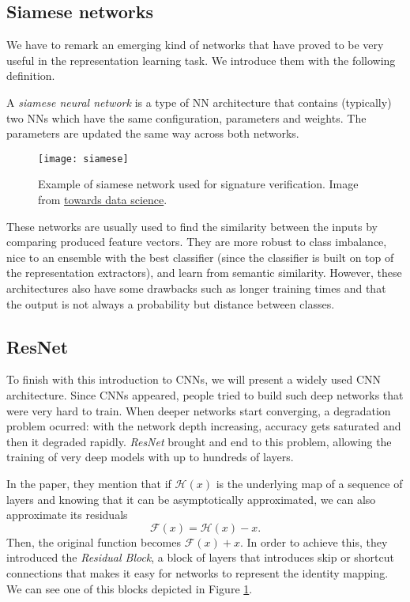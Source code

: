 \subsection{Siamese networks}


We have to remark an emerging kind of networks that have proved to be very useful in the representation learning task. We introduce them with the following definition.

\begin{ndefC}
A \emph{siamese neural network} \citep{voinov_explanation_2021} is a type of NN architecture that contains (typically) two NNs which have the same configuration, parameters and weights. The parameters are updated the same way across both networks. 
\end{ndefC}

\begin{figure}[H]
    \centering
    \texttt{[image: siamese]}
    \caption{Example of siamese network used for signature verification. Image from \href{https://towardsdatascience.com/a-friendly-introduction-to-siamese-networks-85ab17522942}{towards data science}. } \label{fig:resnet:block}
\end{figure}


These networks are usually used to find the similarity between the inputs by comparing produced feature vectors. They are more robust to class imbalance, nice to an ensemble with the best classifier (since the classifier is built on top of the representation extractors), and learn from semantic similarity. However, these architectures also have some drawbacks such as longer training times and that the output is not always a probability but distance between classes.




\subsection{ResNet}

To finish with this introduction to CNNs, we will present a widely used CNN architecture. Since CNNs appeared, people tried to build such deep networks that were very hard to train. When deeper networks start converging, a degradation problem ocurred: with the network depth increasing, accuracy gets saturated and then it degraded rapidly. \emph{ResNet} \citep{he2015deep} brought and end to this problem, allowing the training of very deep models with up to hundreds of layers.

In the paper, they mention that if $\mathcal H(x)$ is the underlying map of a sequence of layers and knowing that it can be asymptotically approximated, we can also approximate its residuals
\[
\mathcal F(x) = \mathcal H(x) - x.    
\]
Then, the original function becomes $\mathcal F(x) + x$. In order to achieve this, they introduced the \emph{Residual Block}, a block of layers that introduces skip or shortcut connections that makes it easy for networks to represent the identity mapping. We can see one of this blocks depicted in Figure \ref{fig:resnet:block}.

